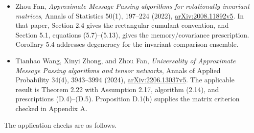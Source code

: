 \documentclass[
  11pt,
  a4paper,
]{article}
\providecommand{\tightlist}{%
  \setlength{\itemsep}{0pt}\setlength{\parskip}{0pt}}
\begin{document}
\begin{itemize}
\tightlist
\item
  Zhou Fan, \emph{Approximate Message Passing algorithms for
  rotationally invariant matrices}, Annals of Statistics 50(1), 197--224
  (2022), \href{https://arxiv.org/pdf/2008.11892}{arXiv:2008.11892v5}.
  In that paper, Section 2.4 gives the rectangular cumulant convention,
  and Section 5.1, equations (5.7)--(5.13), gives the memory/covariance
  prescription. Corollary 5.4 addresses degeneracy for the invariant
  comparison ensemble.
\item
  Tianhao Wang, Xinyi Zhong, and Zhou Fan, \emph{Universality of
  Approximate Message Passing algorithms and tensor networks}, Annals of
  Applied Probability 34(4), 3943--3994 (2024),
  \href{https://arxiv.org/html/2206.13037v5}{arXiv:2206.13037v5}. The
  applicable result is Theorem 2.22 with Assumption 2.17, algorithm
  (2.14), and prescriptions (D.4)--(D.5). Proposition D.1(b) supplies
  the matrix criterion checked in Appendix A.
\end{itemize}

The application checks are as follows.
\end{document}
